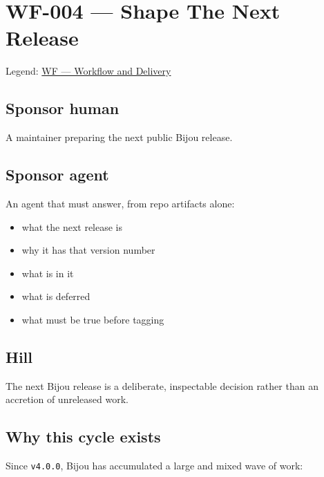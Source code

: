 \chapter{WF-004 --- Shape The Next Release}\label{record-202}

\smallskip

Legend: \href{https://github.com/flyingrobots/bijou/blob/1853ad902f6bf219326409e7f743a5a1d6517dbc/docs/legends/WF-workflow-and-delivery.md}{WF --- Workflow and Delivery}

\section{Sponsor human}\label{record-202-sponsor-human}

A maintainer preparing the next public Bijou release.

\section{Sponsor agent}\label{record-202-sponsor-agent}

An agent that must answer, from repo artifacts alone:

\begin{itemize}
\tightlist
\item
  what the next release is
\item
  why it has that version number
\item
  what is in it
\item
  what is deferred
\item
  what must be true before tagging
\end{itemize}

\section{Hill}\label{record-202-hill}

The next Bijou release is a deliberate, inspectable decision rather than an accretion of unreleased work.

\section{Why this cycle exists}\label{record-202-why-this-cycle-exists}

Since \texttt{v\allowbreak{}4\allowbreak{}.\allowbreak{}0\allowbreak{}.\allowbreak{}0}, Bijou has accumulated a large and mixed wave of work:

